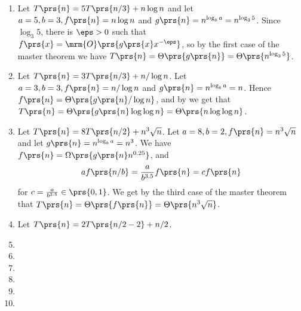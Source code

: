\documentclass[oneside]{scrbook}
\theoremstyle{definition}
\begin{document}
\begin{problem}
\begin{enumerate}[label=\alph*.]
\item %
Let $T\prs{n} = 5T\prs{n/3} + n \log n$ and let $a = 5, b = 3, f\prs{n} = n \log n$ and $g\prs{n} = n^{\log_b a} = n^{\log_3 5}$. Since $\log_3 5$, there is $\eps > 0$ such that $f\prs{x} = \mrm{O}\prs{g\prs{x} x^{-\eps}}$, so by the first case of the master theorem we have $T\prs{n} = \Theta\prs{g\prs{n}} = \Theta\prs{n^{\log_3 5}}$.
\item %
Let $T\prs{n} = 3T\prs{n/3} + n/\log n$. Let $a = 3, b = 3, f\prs{n} = n/\log n$ and $g\prs{n} = n^{\log_b a} = n$. Hence $f\prs{n} = \Theta\prs{g\prs{n} / \log n}$, and by  we get that $T\prs{n} = \Theta\prs{g\prs{n} \log \log n} = \Theta\prs{n \log \log n}$.
\item %
Let $T\prs{n} = 8 T\prs{n/2} + n^3 \sqrt{n}$. Let $a = 8, b = 2, f\prs{n} = n^3 \sqrt{n}$ and let $g\prs{n} = n^{\log_b a} = n^3$. We have $f\prs{n} = \Omega\prs{g\prs{n} n^{0.25}}$, and
\begin{align*}
a f\prs{n/b} = \frac{a}{b^{3.5}} f\prs{n} = c f\prs{n}
\end{align*}
for $c = \frac{a}{b^{3.5}} \in \prs{0,1}$. We get by the third case of the master theorem that $T\prs{n} = \Theta\prs{f\prs{n}} = \Theta\prs{n^3 \sqrt{n}}$.
\item %
Let $T\prs{n} = 2T\prs{n/2 - 2} + n/2$.
\item %
\item %
\item %
\item %
\item %
\item %
\end{enumerate}
\end{problem}

\begin{problem}
\end{problem}

\begin{problem}
\end{problem}

\begin{problem}
\end{problem}

\printbibliography
\printindex
\end{document}
